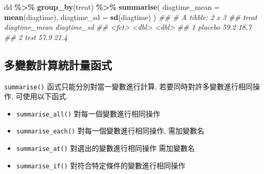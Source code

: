 \documentclass[
]{book}
\newenvironment{Shaded}{\begin{snugshade}}{\end{snugshade}}
\newcommand{\CommentTok}[1]{\textcolor[rgb]{0.56,0.35,0.01}{\textit{#1}}}
\newcommand{\DataTypeTok}[1]{\textcolor[rgb]{0.13,0.29,0.53}{#1}}
\newcommand{\KeywordTok}[1]{\textcolor[rgb]{0.13,0.29,0.53}{\textbf{#1}}}
\newcommand{\NormalTok}[1]{#1}
\newcommand{\OperatorTok}[1]{\textcolor[rgb]{0.81,0.36,0.00}{\textbf{#1}}}
\newcommand{\StringTok}[1]{\textcolor[rgb]{0.31,0.60,0.02}{#1}}
\providecommand{\tightlist}{%
  \setlength{\itemsep}{0pt}\setlength{\parskip}{0pt}}
\begin{document}
\begin{Shaded}
\begin{Highlighting}[]
\NormalTok{dd }\OperatorTok{\%\textgreater{}\%}\StringTok{ }
\StringTok{  }\KeywordTok{group\_by}\NormalTok{(treat) }\OperatorTok{\%\textgreater{}\%}\StringTok{ }
\StringTok{  }\KeywordTok{summarise}\NormalTok{(}
    \DataTypeTok{diagtime\_mean =} \KeywordTok{mean}\NormalTok{(diagtime),}
    \DataTypeTok{diagtime\_sd =} \KeywordTok{sd}\NormalTok{(diagtime)}
\NormalTok{    )}
\CommentTok{\#\# \# A tibble: 2 x 3}
\CommentTok{\#\#   treat   diagtime\_mean diagtime\_sd}
\CommentTok{\#\#   \textless{}fct\textgreater{}           \textless{}dbl\textgreater{}       \textless{}dbl\textgreater{}}
\CommentTok{\#\# 1 placebo          59.2        18.7}
\CommentTok{\#\# 2 test             57.9        21.4}
\end{Highlighting}
\end{Shaded}

\hypertarget{ux591aux8b8aux6578ux8a08ux7b97ux7d71ux8a08ux91cfux51fdux5f0f}{%
\subsection{多變數計算統計量函式}\label{ux591aux8b8aux6578ux8a08ux7b97ux7d71ux8a08ux91cfux51fdux5f0f}}

\texttt{summarise()} 函式只能分別對當一變數進行計算,
若要同時對許多變數進行相同操作,
可使用以下函式.

\begin{itemize}
\tightlist
\item
  \texttt{summarise\_all()} 對每一個變數進行相同操作
\item
  \texttt{summarise\_each()} 對每一個變數進行相同操作, 需加變數名
\item
  \texttt{summarise\_at()} 對選出的變數進行相同操作 需加變數名
\item
  \texttt{summarise\_if()} 對符合特定條件的變數進行相同操作
\end{itemize}
\end{document}
